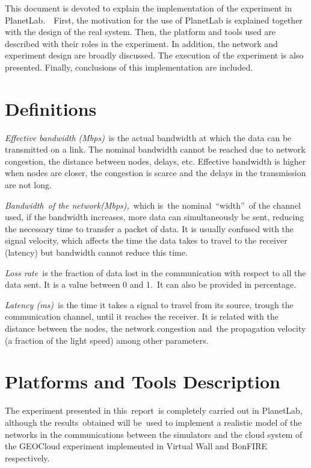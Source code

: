 \documentclass[a4paper]{article}
\begin{document}
\bigskip

This document is devoted to explain the implementation of the experiment
in PlanetLab.\ \ First, the motivation for the use of PlanetLab is
explained together with the design of the real system. Then, the
platform and tools used are described with their roles in the
experiment. In addition, the network and experiment design are broadly
discussed. The execution of the experiment is also presented. Finally,
conclusions of this implementation are included.


\bigskip


\bigskip


\bigskip

\section{Definitions}

\bigskip

\textit{E}\textit{ffective bandwidth (Mbps)}\ is the actual bandwidth at
which the data can be transmitted on a link. The nominal bandwidth
cannot be reached due to network congestion, the distance between
nodes, delays, etc. Effective bandwidth is higher when nodes are
closer, the congestion is scarce and the delays in the transmission are
not long.

\textit{Bandwidth\ }\textit{of the
network}\textit{(Mbps)}\textit{,}\ which is\ the
nominal\ {\textquotedblleft}width{\textquotedblright}\ of the channel
used, if the bandwidth increases, more data can simultaneously be sent,
reducing the necessary time to transfer a packet of data. It is usually
confused with the signal velocity, which affects the time the data
takes to travel to the receiver (latency) but bandwidth cannot reduce
this time.

\textit{Loss rate\ }is the fraction of data lost in the communication
with respect to all the data sent. It is a value between 0 and 1.\ It
can also be provided in percentage.

\textit{Latency (ms)}\ is the time it takes a signal to travel from its
source, trough the communication channel, until it reaches the
receiver. It is related with the distance between the nodes, the
network congestion and\ the propagation velocity (a fraction of the
light speed) among other parameters.\ 


\bigskip

\section[Platforms and Tools Description]{Platforms and Tools
Description}
\hypertarget{Toc387315383}{}The experiment presented in this\ report\ is
completely carried out in PlanetLab, although the results\ obtained
will be\ used to implement a realistic model of the networks in the
communications between the simulators and the cloud system of the
GEOCloud experiment implemented in Virtual Wall and BonFIRE
respectively.\ 
\end{document}
